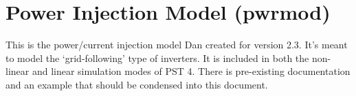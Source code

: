 \section{Power Injection Model (pwrmod)}  
This is the power/current injection model Dan created for version 2.3.
It's meant to model the `grid-following' type of inverters.
It is included in both the non-linear and linear simulation modes of PST 4.
There is pre-existing documentation and an example that should be condensed into this document.